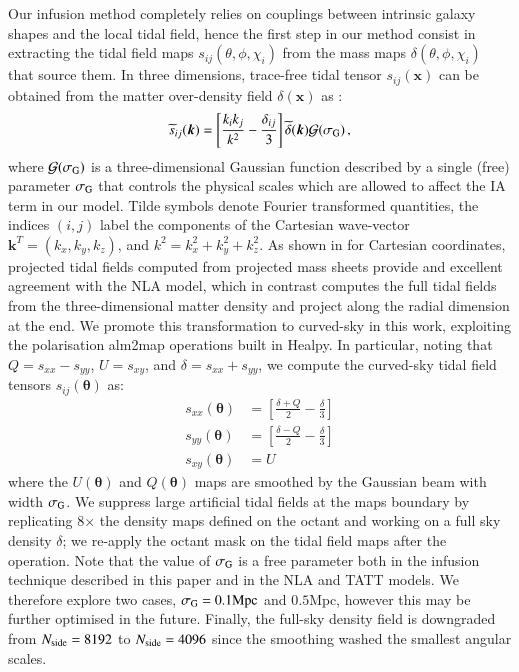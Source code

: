 Our infusion method completely relies on couplings between intrinsic galaxy shapes and the local tidal field, hence the first step in our method consist in extracting the tidal field maps $s_{ij}(\theta,\phi,\chi_i)$ from the mass maps $\delta(\theta,\phi,\chi_i)$ that source them.
In three dimensions, trace-free tidal tensor $s_{ij}(\boldsymbol x)$ can be obtained from the matter over-density field $\delta(\boldsymbol x)$ as   \citep{Catelan_IA_Tidal}:
\begin{eqnarray}
 \widetilde{s}_{ij} (\boldsymbol k)  = \left[\frac{k_i k_j}{k^2} - \frac{\delta_{ij}}{3}\right]  \widetilde {\delta}(\boldsymbol k) \mathcal{G}(\sigma_{\rm G}) \, ,
 \label{eq:sij}
\end{eqnarray}
where $\mathcal{G}(\sigma_{\rm G})$ is a three-dimensional Gaussian function described by a single (free) parameter $\sigma_{\rm G}$ that  controls the physical scales which are allowed to affect the IA term in our model. 
Tilde symbols denote Fourier transformed quantities, the indices $(i,j)$ label the components of the Cartesian wave-vector $\boldsymbol{k}^T = (k_x,k_y,k_z)$, and $k^2 = k_x^2 + k_y^2 + k_z^2$. 
As shown in \citet{Tidalator} for Cartesian coordinates, projected tidal fields  computed from projected mass sheets provide and excellent agreement with the NLA model, which in contrast computes the full tidal fields from the three-dimensional matter density and project along the radial dimension at the end.
We promote this transformation to curved-sky in this work, exploiting the  polarisation {\sc alm2map} operations built in {\sc Healpy}. 
In particular, noting that $Q=s_{xx}-s_{yy}$, $U=s_{xy}$, and $\delta=s_{xx}+s_{yy}$, we compute the curved-sky tidal field tensors ${s}_{ij}({\boldsymbol \theta})$ as:
\begin{equation}\label{eq:sij_2D_sph}
\begin{split}
    s_{xx}({\boldsymbol \theta})  &=  \left[\frac{ \delta + Q}{2}  - \frac{\delta}{3}\right] \\ s_{yy}({\boldsymbol \theta})  &=  \left[\frac{\delta - Q}{2}  - \frac{\delta}{3}\right] \\ s_{xy}({\boldsymbol \theta}) &= U
\end{split}
\end{equation}
where the $U({\boldsymbol \theta})$ and $Q({\boldsymbol \theta})$ maps are smoothed by the Gaussian beam with width $\sigma_{\rm G}$.
We suppress large artificial tidal fields at the maps boundary by replicating 8$\times$ the density maps defined on the octant and working on a full sky density $\delta$; we re-apply the octant mask on the tidal field maps after the operation.
Note that the value of $\sigma_{\rm G}$ is a free parameter both in the infusion technique described in this paper and in the NLA and TATT models.
We therefore explore two cases, $\sigma_{\rm G}=0.1\mathrm{Mpc}$ and $0.5\mathrm{Mpc}$, however this may be further optimised in the future.
Finally, the full-sky density field is downgraded from $N_{\rm side}=8192$ to $N_{\rm side}=4096$ since the smoothing washed the smallest angular scales. 


